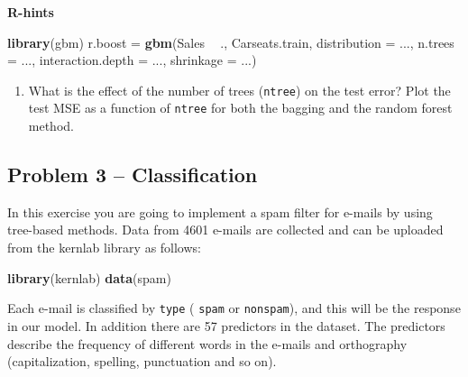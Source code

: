 \documentclass[]{article}
\newenvironment{Shaded}{\begin{snugshade}}{\end{snugshade}}
\newcommand{\DataTypeTok}[1]{\textcolor[rgb]{0.13,0.29,0.53}{#1}}
\newcommand{\KeywordTok}[1]{\textcolor[rgb]{0.13,0.29,0.53}{\textbf{#1}}}
\newcommand{\NormalTok}[1]{#1}
\newcommand{\OperatorTok}[1]{\textcolor[rgb]{0.81,0.36,0.00}{\textbf{#1}}}
\newcommand{\StringTok}[1]{\textcolor[rgb]{0.31,0.60,0.02}{#1}}
\providecommand{\tightlist}{%
  \setlength{\itemsep}{0pt}\setlength{\parskip}{0pt}}
\begin{document}
\textbf{R-hints}

\begin{Shaded}
\begin{Highlighting}[]
\KeywordTok{library}\NormalTok{(gbm)}
\NormalTok{r.boost =}\StringTok{ }\KeywordTok{gbm}\NormalTok{(Sales }\OperatorTok{~}\StringTok{ }\NormalTok{., Carseats.train, }\DataTypeTok{distribution =}\NormalTok{ ..., }\DataTypeTok{n.trees =}\NormalTok{ ..., }\DataTypeTok{interaction.depth =}\NormalTok{ ..., }
    \DataTypeTok{shrinkage =}\NormalTok{ ...)}
\end{Highlighting}
\end{Shaded}

\begin{enumerate}
\def\labelenumi{\alph{enumi})}
\setcounter{enumi}{6}
\tightlist
\item
  What is the effect of the number of trees (\texttt{ntree}) on the test
  error? Plot the test MSE as a function of \texttt{ntree} for both the
  bagging and the random forest method.
\end{enumerate}

\hypertarget{problem-3-classification}{%
\subsection{Problem 3 --
Classification}\label{problem-3-classification}}

In this exercise you are going to implement a spam filter for e-mails by
using tree-based methods. Data from 4601 e-mails are collected and can
be uploaded from the kernlab library as follows:

\begin{Shaded}
\begin{Highlighting}[]
\KeywordTok{library}\NormalTok{(kernlab)}
\KeywordTok{data}\NormalTok{(spam)}
\end{Highlighting}
\end{Shaded}

Each e-mail is classified by \texttt{type} ( \texttt{spam} or
\texttt{nonspam}), and this will be the response in our model. In
addition there are 57 predictors in the dataset. The predictors describe
the frequency of different words in the e-mails and orthography
(capitalization, spelling, punctuation and so on).
\end{document}
